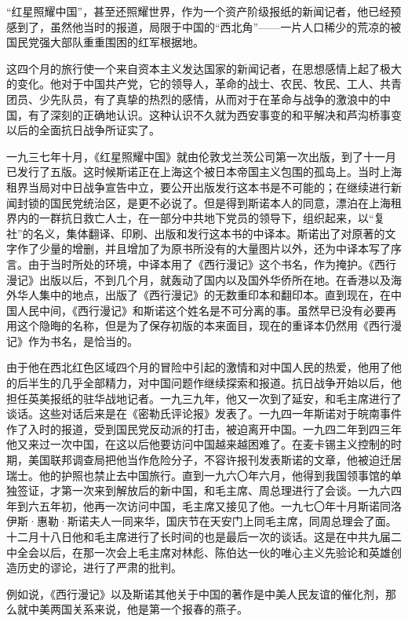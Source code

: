 \documentclass[10pt]{book}
\begin{document}
“红星照耀中国”，甚至还照耀世界，作为一个资产阶级报纸的新闻记者，他已经预感到了，虽然他当时的报道，局限于中国的“西北角”——一片人口稀少的荒凉的被国民党强大部队重重围困的红军根据地。

这四个月的旅行使一个来自资本主义发达国家的新闻记者，在思想感情上起了极大的变化。他对于中国共产党，它的领导人，革命的战士、农民、牧民、工人、共青团员、少先队员，有了真挚的热烈的感情，从而对于在革命与战争的激浪中的中国，有了深刻的正确地认识。这种认识不久就为西安事变的和平解决和芦沟桥事变以后的全面抗日战争所证实了。

一九三七年十月，《红星照耀中国》就由伦敦戈兰茨公司第一次出版，到了十一月已发行了五版。这时候斯诺正在上海这个被日本帝国主义包围的孤岛上。当时上海租界当局对中日战争宣告中立，要公开出版发行这本书是不可能的；在继续进行新闻封锁的国民党统治区，是更不必说了。但是得到斯诺本人的同意，漂泊在上海租界内的一群抗日救亡人士，在一部分中共地下党员的领导下，组织起来，以“复社”的名义，集体翻译、印刷、出版和发行这本书的中译本。斯诺出了对原著的文字作了少量的增删，并且增加了为原书所没有的大量图片以外，还为中译本写了序言。由于当时所处的环境，中译本用了《西行漫记》这个书名，作为掩护。《西行漫记》出版以后，不到几个月，就轰动了国内以及国外华侨所在地。在香港以及海外华人集中的地点，出版了《西行漫记》的无数重印本和翻印本。直到现在，在中国人民中间，《西行漫记》和斯诺这个姓名是不可分离的事。虽然早已没有必要再用这个隐晦的名称，但是为了保存初版的本来面目，现在的重译本仍然用《西行漫记》作为书名，是恰当的。

由于他在西北红色区域四个月的冒险中引起的激情和对中国人民的热爱，他用了他的后半生的几乎全部精力，对中国问题作继续探索和报道。抗日战争开始以后，他担任英美报纸的驻华战地记者。一九三九年，他又一次到了延安，和毛主席进行了谈话。这些对话后来是在《密勒氏评论报》发表了。一九四一年斯诺对于皖南事件作了入时的报道，受到国民党反动派的打击，被迫离开中国。一九四二年到四三年他又来过一次中国，在这以后他要访问中国越来越困难了。在麦卡锡主义控制的时期，美国联邦调查局把他当作危险分子，不容许报刊发表斯诺的文章，他被迫迁居瑞士。他的护照也禁止去中国旅行。直到一九六〇年六月，他得到我国领事馆的单独签证，才第一次来到解放后的新中国，和毛主席、周总理进行了会谈。一九六四年到六五年初，他再一次访问中国，毛主席又接见了他。一九七〇年十月斯诺同洛伊斯·惠勒·斯诺夫人一同来华，国庆节在天安门上同毛主席，同周总理会了面。十二月十八日他和毛主席进行了长时间的也是最后一次的谈话。这是在中共九届二中全会以后，在那一次会上毛主席对林彪、陈伯达一伙的唯心主义先验论和英雄创造历史的谬论，进行了严肃的批判。

例如说，《西行漫记》以及斯诺其他关于中国的著作是中美人民友谊的催化剂，那么就中美两国关系来说，他是第一个报春的燕子。
\end{document}
